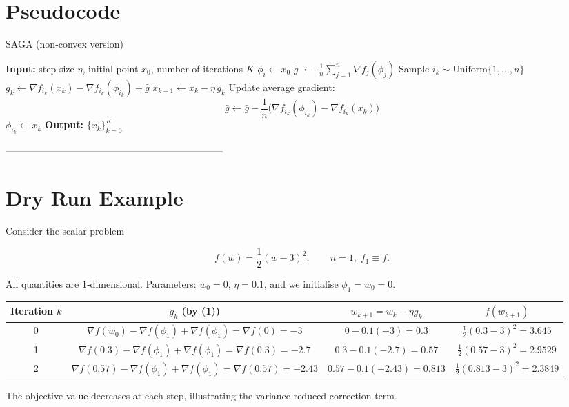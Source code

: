 \documentclass{article}
\newcommand{\grad}{\nabla}
\begin{document}
\section*{Pseudocode}
\begin{algorithm}[H]
\caption{SAGA (non‑convex version)}
\begin{algorithmic}[1]
\STATE \textbf{Input:} step size $\eta$, initial point $x_0$, number of iterations $K$
   \STATE $\phi_i \leftarrow x_0$
\ENDFOR
\STATE $\displaystyle \bar{g}\; \leftarrow\; \frac{1}{n}\sum_{j=1}^{n}\grad f_{j}(\phi_j)$ 
   \STATE Sample $i_k\sim\text{Uniform}\{1,\dots ,n\}$
   \STATE $g_k \leftarrow \grad f_{i_k}(x_k)-\grad f_{i_k}(\phi_{i_k})+\bar{g}$
   \STATE $x_{k+1}\leftarrow x_k-\eta\, g_k$
   \STATE Update average gradient:
   \[
   \bar{g}\leftarrow \bar{g} -\frac{1}{n}\bigl(\grad f_{i_k}(\phi_{i_k})-\grad f_{i_k}(x_k)\bigr)
   \]
   \STATE $\phi_{i_k}\leftarrow x_k$
\ENDFOR
\STATE \textbf{Output:} $\{x_k\}_{k=0}^{K}$
\end{algorithmic}
\end{algorithm}

--------------------------------------------------------------------

\section*{Dry Run Example}
Consider the scalar problem  

\[
f(w)=\frac{1}{2}(w-3)^2,\qquad n=1,\; f_1\equiv f.
\]

All quantities are $1$‑dimensional.  
Parameters: $w_0=0$, $\eta=0.1$, and we initialise $\phi_1=w_0=0$.

\begin{center}
\begin{tabular}{c|c|c|c}
Iteration $k$ & $g_k$ (by (1)) & $w_{k+1}=w_k-\eta g_k$ & $f(w_{k+1})$\\\hline
0 & $\grad f(w_0)-\grad f(\phi_1)+\grad f(\phi_1)=\grad f(0)= -3$ &
$0-0.1(-3)=0.3$ & $\frac12(0.3-3)^2=3.645$\\
1 & $\grad f(0.3)-\grad f(\phi_1)+\grad f(\phi_1)=\grad f(0.3)= -2.7$ &
$0.3-0.1(-2.7)=0.57$ & $\frac12(0.57-3)^2=2.9529$\\
2 & $\grad f(0.57)-\grad f(\phi_1)+\grad f(\phi_1)=\grad f(0.57)= -2.43$ &
$0.57-0.1(-2.43)=0.813$ & $\frac12(0.813-3)^2=2.3849$\\
\end{tabular}
\end{center}
The objective value decreases at each step, illustrating the variance‑reduced correction term.
\end{document}
